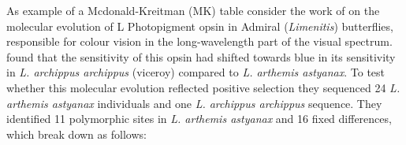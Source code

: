 As example of a Mcdonald-Kreitman (MK) table consider the work of \citet{frentiu2007adaptive} on the molecular evolution of L Photopigment opsin in Admiral
({\it Limenitis}) butterflies, responsible for colour vision in the
long-wavelength part of the visual
spectrum. \citeauthor{frentiu2007adaptive} found that the sensitivity
of this opsin had shifted towards blue in its sensitivity in {\it
  L. archippus archippus} (viceroy) compared to {\it  L. arthemis
  astyanax}. To test whether this molecular evolution reflected
positive selection they sequenced  24 {\it L. arthemis astyanax}
individuals and one {\it  L. archippus archippus} sequence. They
identified  11 polymorphic sites in  {\it L. arthemis astyanax} and 16
fixed differences, which break down as follows:
